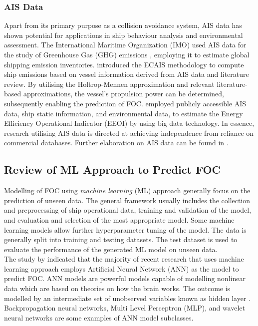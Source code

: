 \subsubsection*{\textbf{AIS Data}} Apart from its primary purpose as a collision avoidance system, AIS data has shown potential for applications in ship behaviour analysis and environmental assessment. The International Maritime Organization (IMO) used AIS data for the study of Greenhouse Gas (GHG) emissions , employing it to estimate global shipping emission inventories.  introduced the ECAIS methodology to compute ship emissions based on vessel information derived from AIS data and literature review. By utilising the Holtrop-Mennen approximation and relevant literature-based approximations, the vessel's propulsion power can be determined, subsequently enabling the prediction of FOC.  employed publicly accessible AIS data, ship static information, and environmental data, to estimate the Energy Efficiency Operational Indicator (EEOI) by using big data technology. In essence, research utilising AIS data is directed at achieving independence from reliance on commercial databases. Further elaboration on AIS data can be found in .  

\subsection{Review of ML Approach to Predict FOC}\label{sec:ml_var_appl}

Modelling of FOC using \emph{machine learning} (ML) approach generally focus on the prediction of unseen data. The general framework usually includes the collection and preprocessing of ship operational data, training and validation of the model, and evaluation and selection of the most appropriate model. Some machine learning models allow further hyperparameter tuning of the model. The data is generally split into training and testing datasets. The test dataset is used to evaluate the performance of the generated ML model on unseen data.\\

The study by  indicated that the majority of recent research that uses machine learning approach employs Artificial Neural Network (ANN) as the model to predict FOC. ANN models are powerful models capable of modelling nonlinear data which are based on theories on how the brain works. The outcome is modelled by an intermediate set of unobserved variables known as hidden layer . Backpropagation neural networks, Multi Level Perceptron (MLP), and wavelet neural networks are some examples of ANN model subclasses.\\

